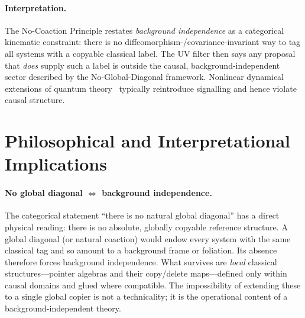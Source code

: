 \documentclass[11pt]{article}
\theoremstyle{upright}
\begin{document}
\paragraph{Interpretation.}
The No-Coaction Principle restates \emph{background independence} as a categorical kinematic constraint: there is no diffeomorphism-/covariance-invariant way to tag all systems with a copyable classical label. The UV filter then says any proposal that \emph{does} supply such a label is outside the causal, background-independent sector described by the No-Global-Diagonal framework. Nonlinear dynamical extensions of quantum theory~\cite{Gisin1990,Polchinski1991} typically reintroduce signalling and hence violate causal structure.

\section{Philosophical and Interpretational Implications}
\label{sec:philosophy}

\paragraph{No global diagonal $\Longleftrightarrow$ background independence.}
The categorical statement ``there is no natural global diagonal'' has a direct physical reading: there is no absolute, globally copyable reference structure. A global diagonal (or natural coaction) would endow every system with the same classical tag and so amount to a background frame or foliation. Its absence therefore forces background independence. What survives are \emph{local} classical structures—pointer algebras and their copy/delete maps—defined only within causal domains and glued where compatible. The impossibility of extending these to a single global copier is not a technicality; it is the operational content of a background-independent theory.
\end{document}
